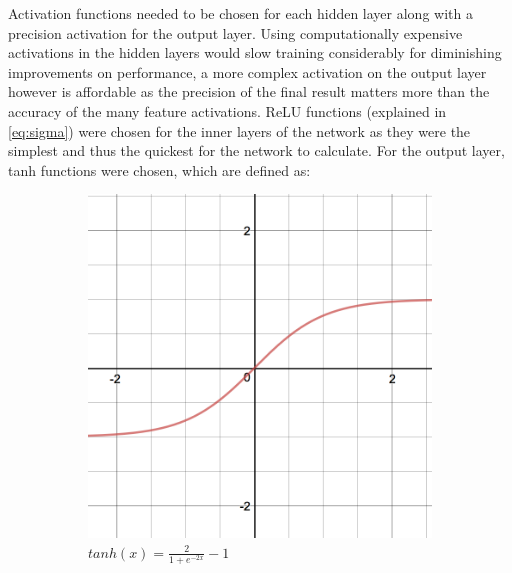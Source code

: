 \documentclass{l4proj}
\begin{document}
Activation functions needed to be chosen for each hidden layer along with a precision activation for the output layer. Using computationally expensive activations in the hidden layers would slow training considerably for diminishing improvements on performance, a more complex activation on the output layer however is affordable as the precision of the final result matters more than the accuracy of the many feature activations. ReLU functions (explained in \ref{eq:sigma}) were chosen for the inner layers of the network as they were the simplest and thus the quickest for the network to calculate. For the output layer, tanh functions were chosen, which are defined as:
\begin{figure}[h]
    \centering
    \begin{subfigure}[b]{0.4\textwidth}
        \includegraphics[width=\textwidth]{images/tanh.PNG}
        \caption{$tanh(x) = \frac{2}{1+e^{-2x}}-1$}
    \end{subfigure}
    \quad
    \begin{subfigure}[b]{0.4\textwidth}

\end{subfigure}
\end{figure}
\end{document}
